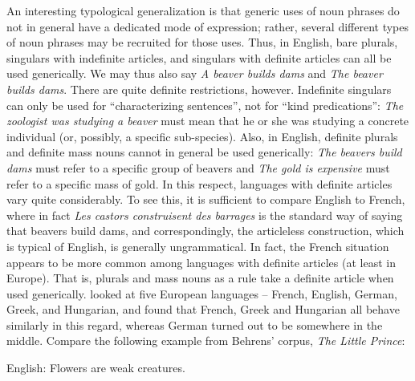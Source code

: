 \begin{styleBodytextC}
An interesting typological generalization is that generic uses of noun phrases do not in general have a dedicated mode of expression; rather, several different types of noun phrases may be recruited for those uses. Thus, in English, bare plurals, singulars with indefinite articles, and singulars with definite articles can all be used generically. We may thus also say \textit{A beaver builds dams} and \textit{The beaver builds dams}. There are quite definite restrictions, however. Indefinite singulars can only be used for “characterizing sentences”, not for “kind predications”: \textit{The zoologist was studying a beaver }must mean that he or she was studying a concrete individual (or, possibly, a specific sub-species). Also, in English, definite plurals and definite mass nouns cannot in\textbf{ }general be used generically: \textit{The beavers build dams} must refer to a specific group of beavers and \textit{The gold is expensive} must refer to a specific mass of gold. In this respect, languages with definite articles vary quite considerably. To see this, it is sufficient to compare English to French, where in fact \textit{Les castors construisent des barrages} is the standard way of saying that beavers build dams, and correspondingly, the articleless construction, which is typical of English, is generally ungrammatical. In fact, the French situation appears to be more common among languages with definite articles (at least in Europe). That is, plurals and mass nouns as a rule take a definite article when used generically. \citet{Behrens2005} looked at five European languages – French, English, German, Greek, and Hungarian, and found that French, Greek and Hungarian all behave similarly in this regard, whereas German turned out to be somewhere in the middle. Compare the following example from Behrens’ corpus, \textit{The Little Prince}:

\end{styleBodytextC}

\begin{listWWNumileveli}
\item {}

\end{listWWNumileveli}

\begin{listWWNumxvileveli}
\item {}

\begin{styleExLtrTbl}
\label{bkm:Ref135628619}English: Flowers are weak creatures.

\end{styleExLtrTbl}

\end{listWWNumxvileveli}

